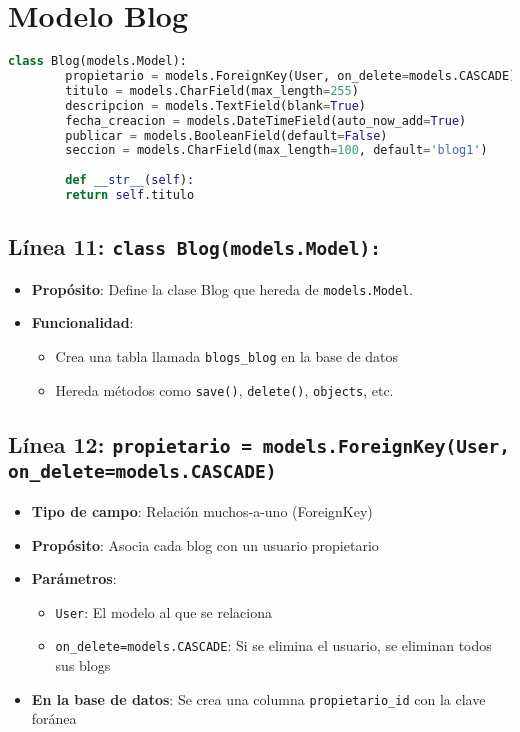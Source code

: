 \documentclass[12pt,a4paper]{article}
\begin{document}
	\section{Modelo Blog}
	
	\begin{lstlisting}[language=Python]
		class Blog(models.Model):
		propietario = models.ForeignKey(User, on_delete=models.CASCADE)
		titulo = models.CharField(max_length=255)
		descripcion = models.TextField(blank=True)
		fecha_creacion = models.DateTimeField(auto_now_add=True)
		publicar = models.BooleanField(default=False)
		seccion = models.CharField(max_length=100, default='blog1')
		
		def __str__(self):
		return self.titulo
	\end{lstlisting}
	
	\subsection{Línea 11: \texttt{class Blog(models.Model):}}
	\begin{itemize}
		\item \textbf{Propósito}: Define la clase Blog que hereda de \texttt{models.Model}.
		\item \textbf{Funcionalidad}:
		\begin{itemize}
			\item Crea una tabla llamada \texttt{blogs\_blog} en la base de datos
			\item Hereda métodos como \texttt{save()}, \texttt{delete()}, \texttt{objects}, etc.
		\end{itemize}
	\end{itemize}
	
	\subsection{Línea 12: \texttt{propietario = models.ForeignKey(User, on\_delete=models.CASCADE)}}
	\begin{itemize}
		\item \textbf{Tipo de campo}: Relación muchos-a-uno (ForeignKey)
		\item \textbf{Propósito}: Asocia cada blog con un usuario propietario
		\item \textbf{Parámetros}:
		\begin{itemize}
			\item \texttt{User}: El modelo al que se relaciona
			\item \texttt{on\_delete=models.CASCADE}: Si se elimina el usuario, se eliminan todos sus blogs
		\end{itemize}
		\item \textbf{En la base de datos}: Se crea una columna \texttt{propietario\_id} con la clave foránea
	\end{itemize}
	
\end{document}
